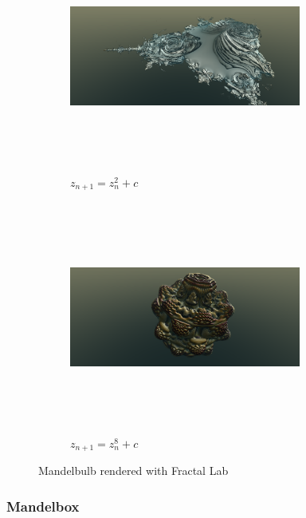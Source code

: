 \begin{figure}[h!tbp]
 \begin{subfigure}{0.49\hsize}
  \center
  \includegraphics[width=3in, height=3in, keepaspectratio]{../img/fractal/mandelbulb2.pdf}
  \caption{$z_{n + 1} = z_n^2 + c$}
  \label{fig:mandelbulb2}
 \end{subfigure}
 \hspace*{\fill}
 \begin{subfigure}{0.49\hsize}
  \center
  \includegraphics[width=3in, height=3in, keepaspectratio]{../img/fractal/mandelbulb8.pdf}
  \caption{$z_{n+1} = z_n^8 + c$}
  \label{fig:mandelbulb8}
 \end{subfigure}
 \caption{Mandelbulb rendered with Fractal Lab}
\end{figure}

\subsubsection{Mandelbox}

